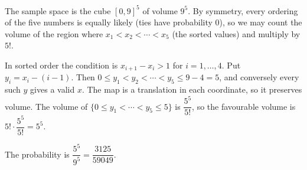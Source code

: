 The sample space is the cube $[0,9]^5$ of volume $9^5$. By symmetry, every ordering of the five numbers is equally likely (ties have probability $0$), so we may count the volume of the region where $x_1<x_2<\cdots<x_5$ (the sorted values) and multiply by $5!$.

In sorted order the condition is $x_{i+1}-x_i>1$ for $i=1,\dots,4$. Put $y_i=x_i-(i-1)$. Then $0\le y_1<y_2<\cdots<y_5\le9-4=5$, and conversely every such $y$ gives a valid $x$. The map is a translation in each coordinate, so it preserves volume. The volume of $\{0\le y_1<\cdots<y_5\le5\}$ is $\dfrac{5^5}{5!}$, so the favourable volume is $5!\cdot\dfrac{5^5}{5!}=5^5$.

The probability is $\dfrac{5^5}{9^5}=\boxed{\dfrac{3125}{59049}}$.
